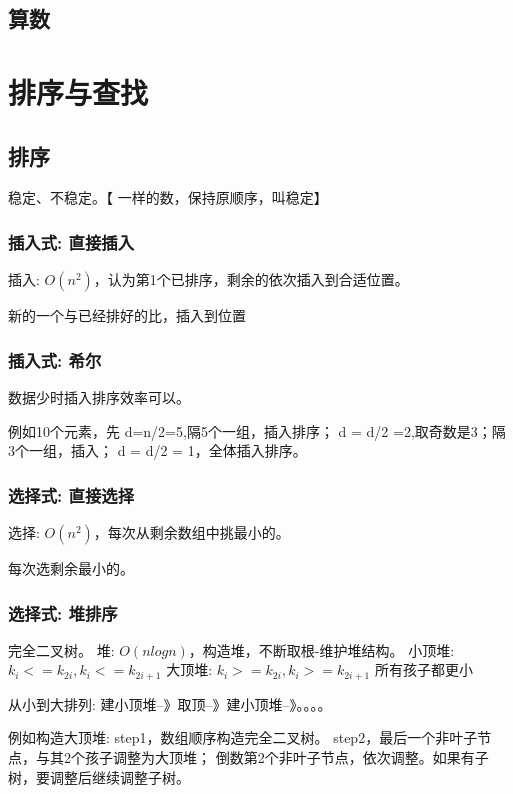 \documentclass[UTF8]{../computerUniverse}
\begin{document}
\section{算数}






\chapter{排序与查找}

\section{排序}

稳定、不稳定。【 一样的数，保持原顺序，叫稳定】



\subsection{插入式: 直接插入}
插入: $O(n^2)$，认为第1个已排序，剩余的依次插入到合适位置。

新的一个与已经排好的比，插入到位置


\subsection{插入式: 希尔}
数据少时插入排序效率可以。

例如10个元素，先
d=n/2=5,隔5个一组，插入排序；
d = d/2  =2,取奇数是3；隔3个一组，插入；
d = d/2 = 1，全体插入排序。


\subsection{选择式: 直接选择}
选择: $O(n^2)$，每次从剩余数组中挑最小的。

每次选剩余最小的。


\subsection{选择式: 堆排序}
完全二叉树。
堆: $O(nlogn)$，构造堆，不断取根-维护堆结构。
小顶堆: $k_i<=k_{2i}, k_i<=k_{2i+1}$
大顶堆: $k_i>=k_{2i}, k_i>=k_{2i+1}$ 所有孩子都更小

从小到大排列: 建小顶堆--》取顶--》建小顶堆--》。。。。

例如构造大顶堆: 
step1，数组顺序构造完全二叉树。
step2，最后一个非叶子节点，与其2个孩子调整为大顶堆；
       倒数第2个非叶子节点，依次调整。如果有子树，要调整后继续调整子树。
       
\end{document}
